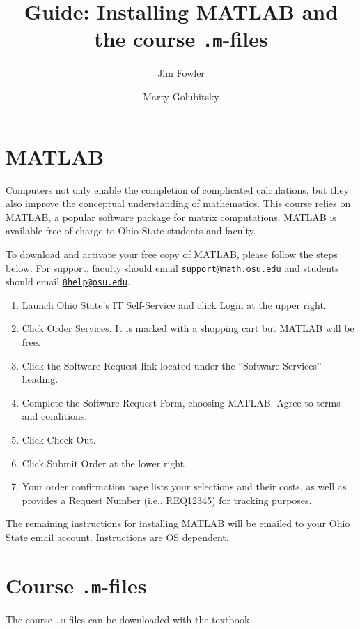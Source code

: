 \documentclass{article}
\title{Guide: Installing MATLAB and the course \texttt{.m}-files}
\author{Jim Fowler \and Marty Golubitsky}
\begin{document}
\maketitle

\section{MATLAB}\label{for-ohio-state-faculty-and-students}

Computers not only enable the completion of complicated calculations,
but they also improve the conceptual understanding of
mathematics. This course relies on MATLAB, a popular software package
for matrix computations. MATLAB is available free-of-charge to Ohio
State students and faculty.

To download and activate your free copy of MATLAB, please follow the
steps below.  For support, faculty should email
\href{mailto:support@math.osu.edu}{\texttt{support@math.osu.edu}} and
students should email
\href{mailto:8help@osu.edu}{\texttt{8help@osu.edu}}.

\begin{enumerate}
\def\labelenumi{\arabic{enumi})}
\item Launch \href{https://osuitsm.service-now.com/selfservice/}{Ohio
    State's IT Self-Service} and click Login at the upper right.
\item Click Order Services. It is marked with a shopping cart but
  MATLAB will be free.
\item Click the Software Request link located under the ``Software
  Services'' heading.
\item Complete the Software Request Form, choosing MATLAB. Agree to
  terms and conditions.
\item Click Check Out.
\item Click Submit Order at the lower right.
\item Your order confirmation page lists your selections and their
  costs, as well as provides a Request Number (i.e., REQ12345) for
  tracking purposes.
\end{enumerate}

The remaining instructions for installing MATLAB will be emailed to
your Ohio State email account. Instructions are OS dependent.

\section{Course \texttt{.m}-files}

The course \texttt{.m}-files can be downloaded with the textbook.
\end{document}
